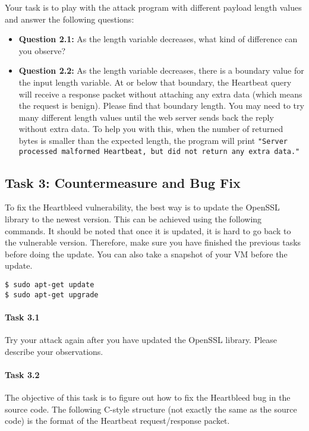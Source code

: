 Your task is to play with the attack program with different payload length
values and answer the
following questions:


\begin{itemize}
  \item {\bf Question 2.1:} As the length variable decreases, what kind of difference can you observe?

  \item {\bf Question 2.2:} As the length variable decreases, there is a boundary value for the input length
    variable.  At or below that boundary, the Heartbeat query will receive
    a response packet
    without attaching any extra data (which means the request is benign). Please find that
    boundary length.  You may need to try many
    different length values until the web server sends back the reply
    without extra data.  To help you with this, when the number of returned bytes is smaller
    than the expected length, the program will print \texttt{"Server processed malformed
    Heartbeat, but did not return any extra data."}
\end{itemize}




\subsection{Task 3: Countermeasure and Bug Fix}

To fix the Heartbleed vulnerability, the best way is to update the OpenSSL
library to the newest version. This can be achieved using the following commands. 
It should be noted that once it is updated, it is hard to go back to the
vulnerable version. Therefore, make sure you have finished the previous
tasks before doing the update. You can also take a snapshot of your VM
before the update.


\begin{lstlisting}
$ sudo apt-get update
$ sudo apt-get upgrade
\end{lstlisting}


\paragraph{Task 3.1} Try your attack again after you have updated the
OpenSSL library. Please describe your observations. 



\paragraph{Task 3.2} The objective of this task is to figure out how to fix
the Heartbleed bug in the source code. The following C-style structure (not
exactly the same as the source code) is the format of the Heartbeat 
request/response packet. 



